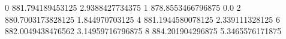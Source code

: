 0 881.794189453125 2.9388427734375
1 878.8553466796875 0.0
2 880.7003173828125 1.844970703125
4 881.1944580078125 2.339111328125
6 882.0049438476562 3.14959716796875
8 884.201904296875 5.3465576171875
